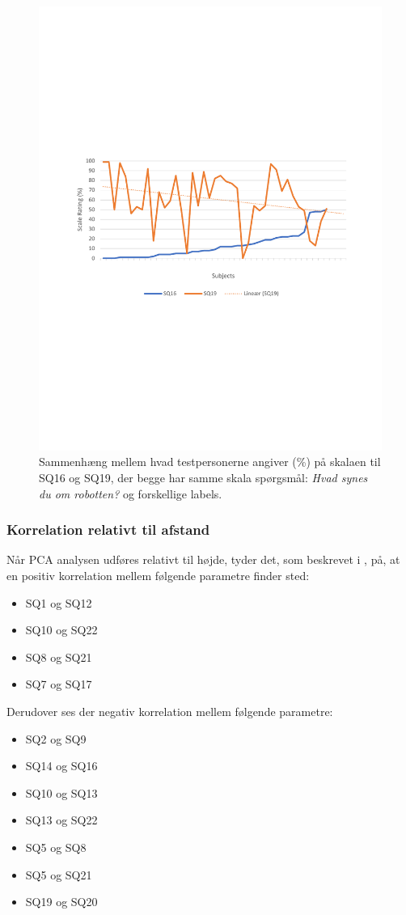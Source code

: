 \begin{figure}[H]
	\centering
	\includegraphics[width=\textwidth]{Figure/Korrelationsgrafer/SQ16+SQ19}
	\caption{Sammenhæng mellem hvad testpersonerne angiver (\%) på skalaen til SQ16 og SQ19, der begge har samme skala spørgsmål: \textit{Hvad synes du om robotten?} og forskellige labels.}
	\label{fig:SammenligningSQ16SQ19}
\end{figure}

\subsubsection{Korrelation relativt til afstand}
Når PCA analysen udføres relativt til højde, tyder det, som beskrevet i , på, at en positiv korrelation mellem følgende parametre finder sted:
\begin{itemize}
	\item SQ1 og SQ12
	\item SQ10 og SQ22
	\item SQ8 og SQ21
	\item SQ7 og SQ17
\end{itemize}
%
Derudover ses der negativ korrelation mellem følgende parametre:
\begin{itemize}
	\item SQ2 og SQ9
	\item SQ14 og SQ16
	\item SQ10 og SQ13
	\item SQ13 og SQ22
	\item SQ5 og SQ8
	\item SQ5 og SQ21
	\item SQ19 og SQ20
\end{itemize}

